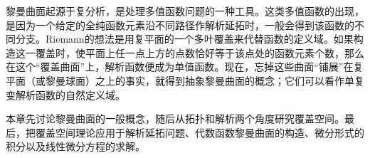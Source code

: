 黎曼曲面起源于复分析，是处理多值函数问题的一种工具。这类多值函数的出现，是因为一个给定的全纯函数元素沿不同路径作解析延拓时，一般会得到该函数的不同分支。Riemann的想法是用复平面的一个多叶覆盖来代替函数的定义域。如果构造这一覆盖时，使平面上任一点上方的点数恰好等于该点处的函数元素个数，那么在这个“覆盖曲面”上，解析函数便成为单值函数。现在，忘掉这些曲面“铺展”在复平面（或黎曼球面）之上的事实，就得到抽象黎曼曲面的概念；它们可以看作单复变解析函数的自然定义域。

本章先讨论黎曼曲面的一般概念，随后从拓扑和解析两个角度研究覆盖空间。最后，把覆盖空间理论应用于解析延拓问题、代数函数黎曼曲面的构造、微分形式的积分以及线性微分方程的求解。
